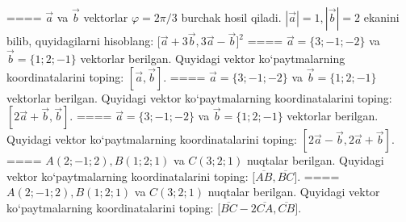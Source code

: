 ====
$\vec{a}$ va $\vec{b}$ vektorlar $\varphi = 2\pi/3$ burchak hosil qiladi. $|\vec{a}| = 1,|\vec{b}| = 2$ ekanini bilib, quyidagilarni hisoblang:
$\lbrack\overrightarrow{a} + 3\overrightarrow{b},3\overrightarrow{a} - \overrightarrow{b}\rbrack^{2}$
====
$\vec{a} = \{ 3; - 1; - 2\}$ va $\vec{b} = \{ 1;2; - 1\}$ vektorlar berilgan. Quyidagi vektor ko‘paytmalarning koordinatalarini toping:
$\left\lbrack \vec{a},\vec{b} \right\rbrack$.
====
$\vec{a} = \{ 3; - 1; - 2\}$ va $\vec{b} = \{ 1;2; - 1\}$ vektorlar berilgan. Quyidagi vektor ko‘paytmalarning koordinatalarini toping:
$\left\lbrack 2\vec{a} + \vec{b},\vec{b} \right\rbrack$.
====
$\vec{a} = \{ 3; - 1; - 2\}$ va $\vec{b} = \{ 1;2; - 1\}$ vektorlar berilgan. Quyidagi vektor ko‘paytmalarning koordinatalarini toping:
$\left\lbrack 2\vec{a} - \vec{b},2\vec{a} + \vec{b} \right\rbrack$.
====
$A (2; -1;2),B (1;2; 1) $ va $C (3;2;1)$ nuqtalar berilgan. Quyidagi vektor ko‘paytmalarning koordinatalarini toping:
$\lbrack\overline{AB},\overline{BC}\rbrack$.
====
$A (2; -1;2),B (1;2; 1) $ va $C (3;2;1) $ nuqtalar berilgan. Quyidagi vektor ko‘paytmalarning koordinatalarini toping:
$\lbrack\overline{BC} - 2\overline{CA},\overline{CB}\rbrack$.